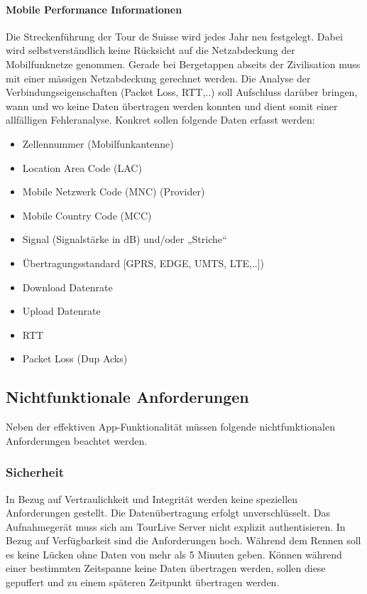 \paragraph{Mobile Performance Informationen}
Die Streckenführung der Tour de Suisse wird jedes Jahr neu festgelegt. Dabei  wird selbstverständlich keine Rücksicht auf die Netzabdeckung der Mobilfunknetze genommen. Gerade bei Bergetappen abseits der Zivilisation muss mit einer mässigen Netzabdeckung gerechnet werden. Die Analyse der Verbindungseigenschaften (Packet Loss, RTT,..) soll Aufschluss darüber bringen, wann und wo keine Daten übertragen werden konnten und dient somit einer allfälligen Fehleranalyse. Konkret sollen folgende Daten erfasst werden:
\begin{itemize}
\item Zellennummer (Mobilfunkantenne)
\item Location Area Code (LAC)
\item Mobile Netzwerk Code (MNC) (Provider)
\item Mobile Country Code (MCC)
\item Signal (Signalstärke in dB) und/oder „Striche“
\item Übertragungsstandard [GPRS, EDGE, UMTS, LTE,..])
\item Download Datenrate
\item Upload Datenrate
\item RTT
\item Packet Loss (Dup Acks)
\end{itemize}
	
\subsection{Nichtfunktionale Anforderungen}
Neben der effektiven App-Funktionalität müssen folgende nichtfunktionalen Anforderungen beachtet werden.
\subsubsection{Sicherheit}
In Bezug auf Vertraulichkeit und Integrität werden keine speziellen Anforderungen gestellt. Die Datenübertragung erfolgt unverschlüsselt. Das Aufnahmegerät muss sich am TourLive Server nicht explizit authentisieren. In Bezug auf Verfügbarkeit sind die Anforderungen hoch. Während dem Rennen soll es keine Lücken ohne Daten von mehr als 5 Minuten geben. Können während einer bestimmten Zeitspanne keine Daten übertragen werden, sollen diese gepuffert und zu einem späteren Zeitpunkt übertragen werden. 
